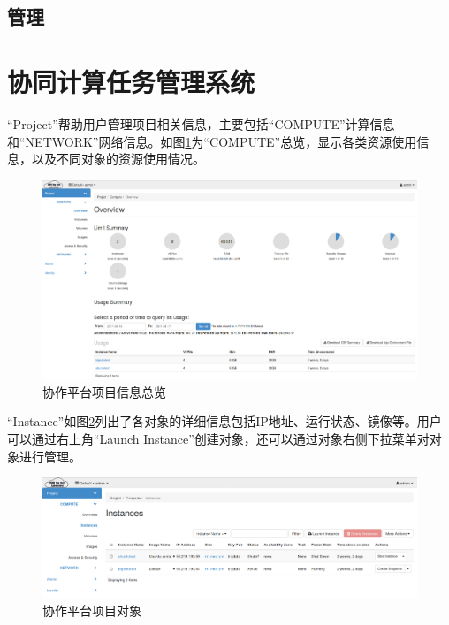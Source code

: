 \documentclass[12pt]{ctexart}%
\begin{document}
\subsection{管理}
\section{协同计算任务管理系统} 
``Project''帮助用户管理项目相关信息，主要包括``COMPUTE''计算信息和``NETWORK''网络信息。如图\ref{fig:projectcomputeoverview}为``COMPUTE''总览，显示各类资源使用信息，以及不同对象的资源使用情况。
\begin{figure}[!htb]
\centering
\includegraphics[width=6in]{./figures/Project_Compute_Overview}
\caption{协作平台项目信息总览}
\label{fig:projectcomputeoverview}
\end{figure}
``Instance''如图\ref{fig:projectcomputeinstances}列出了各对象的详细信息包括IP地址、运行状态、镜像等。用户可以通过右上角``Launch Instance''创建对象，还可以通过对象右侧下拉菜单对对象进行管理。
\begin{figure}[!htb]
\centering
\includegraphics[width=6in]{./figures/Project_Compute_Instances}
\caption{协作平台项目对象}
\label{fig:projectcomputeinstances}
\end{figure}
\end{document}
